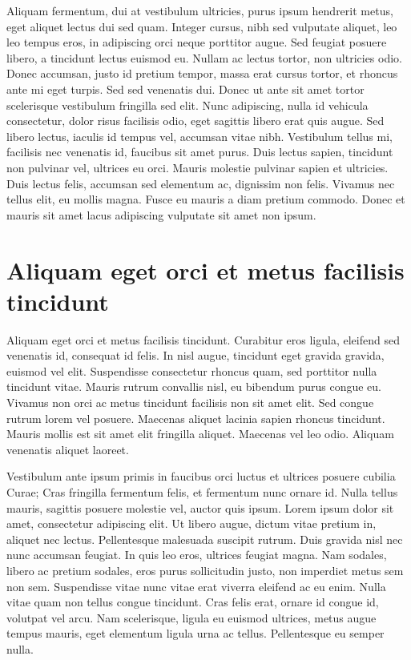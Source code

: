 \documentclass{EPUProjetDi}
\begin{document}
Aliquam fermentum, dui at vestibulum ultricies, purus ipsum hendrerit metus, eget aliquet lectus dui sed quam. Integer cursus, nibh sed vulputate aliquet, leo leo tempus eros, in adipiscing orci neque porttitor augue. Sed feugiat posuere libero, a tincidunt lectus euismod eu. Nullam ac lectus tortor, non ultricies odio. Donec accumsan, justo id pretium tempor, massa erat cursus tortor, et rhoncus ante mi eget turpis. Sed sed venenatis dui. Donec ut ante sit amet tortor scelerisque vestibulum fringilla sed elit. Nunc adipiscing, nulla id vehicula consectetur, dolor risus facilisis odio, eget sagittis libero erat quis augue. Sed libero lectus, iaculis id tempus vel, accumsan vitae nibh. Vestibulum tellus mi, facilisis nec venenatis id, faucibus sit amet purus. Duis lectus sapien, tincidunt non pulvinar vel, ultrices eu orci. Mauris molestie pulvinar sapien et ultricies. Duis lectus felis, accumsan sed elementum ac, dignissim non felis. Vivamus nec tellus elit, eu mollis magna. Fusce eu mauris a diam pretium commodo. Donec et mauris sit amet lacus adipiscing vulputate sit amet non ipsum.

\section{Aliquam eget orci et metus facilisis tincidunt}

Aliquam eget orci et metus facilisis tincidunt. Curabitur eros ligula, eleifend sed venenatis id, consequat id felis. In nisl augue, tincidunt eget gravida gravida, euismod vel elit. Suspendisse consectetur rhoncus quam, sed porttitor nulla tincidunt vitae. Mauris rutrum convallis nisl, eu bibendum purus congue eu. Vivamus non orci ac metus tincidunt facilisis non sit amet elit. Sed congue rutrum lorem vel posuere. Maecenas aliquet lacinia sapien rhoncus tincidunt. Mauris mollis est sit amet elit fringilla aliquet. Maecenas vel leo odio. Aliquam venenatis aliquet laoreet.

Vestibulum ante ipsum primis in faucibus orci luctus et ultrices posuere cubilia Curae; Cras fringilla fermentum felis, et fermentum nunc ornare id. Nulla tellus mauris, sagittis posuere molestie vel, auctor quis ipsum. Lorem ipsum dolor sit amet, consectetur adipiscing elit. Ut libero augue, dictum vitae pretium in, aliquet nec lectus. Pellentesque malesuada suscipit rutrum. Duis gravida nisl nec nunc accumsan feugiat. In quis leo eros, ultrices feugiat magna. Nam sodales, libero ac pretium sodales, eros purus sollicitudin justo, non imperdiet metus sem non sem. Suspendisse vitae nunc vitae erat viverra eleifend ac eu enim. Nulla vitae quam non tellus congue tincidunt. Cras felis erat, ornare id congue id, volutpat vel arcu. Nam scelerisque, ligula eu euismod ultrices, metus augue tempus mauris, eget elementum ligula urna ac tellus. Pellentesque eu semper nulla.
\end{document}
